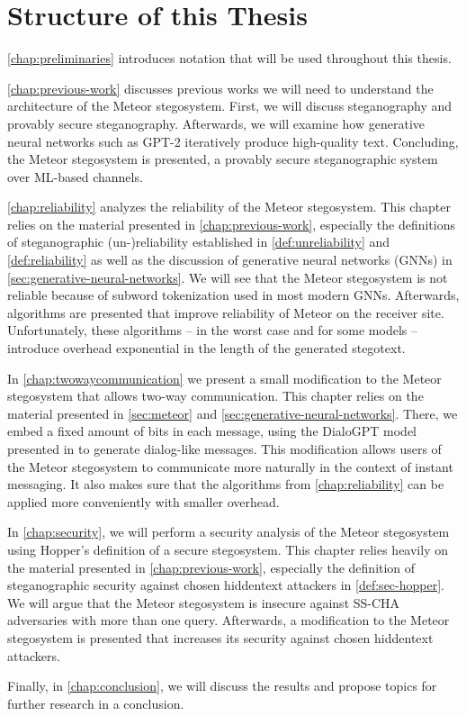\section{Structure of this Thesis}

\autoref{chap:preliminaries} introduces notation that will be used throughout this thesis.

\autoref{chap:previous-work} discusses previous works we will need to understand the architecture of the Meteor stegosystem.
First, we will discuss steganography and provably secure steganography.
Afterwards, we will examine how generative neural networks such as GPT-2 iteratively produce high-quality text.
Concluding, the Meteor stegosystem is presented, a provably secure steganographic system over ML-based channels.

\autoref{chap:reliability} analyzes the reliability of the Meteor stegosystem. 
This chapter relies on the material presented in \autoref{chap:previous-work}, especially the definitions of steganographic (un-)reliability established in \autoref{def:unreliability} and \autoref{def:reliability} as well as the discussion of generative neural networks (GNNs) in \autoref{sec:generative-neural-networks}.
We will see that the Meteor stegosystem is not reliable because of subword tokenization used in most modern GNNs.
Afterwards, algorithms are presented that improve reliability of Meteor on the receiver site.
Unfortunately, these algorithms -- in the worst case and for some models -- introduce overhead exponential in the length of the generated stegotext.

In \autoref{chap:twowaycommunication} we present a small modification to the Meteor stegosystem that allows two-way communication.
This chapter relies on the material presented in \autoref{sec:meteor} and \autoref{sec:generative-neural-networks}.
There, we embed a fixed amount of bits in each message, using the DialoGPT model presented in \cite{Zhang2020} to generate dialog-like messages.
This modification allows users of the Meteor stegosystem to communicate more naturally in the context of instant messaging.
It also makes sure that the algorithms from \autoref{chap:reliability} can be applied more conveniently with smaller overhead.

In \autoref{chap:security}, we will perform a security analysis of the Meteor stegosystem using Hopper's definition of a secure stegosystem.
This chapter relies heavily on the material presented in \autoref{chap:previous-work}, especially the definition of steganographic security against chosen hiddentext attackers in \autoref{def:sec-hopper}.
We will argue that the Meteor stegosystem is insecure against SS-CHA adversaries with more than one query.
Afterwards, a modification to the Meteor stegosystem is presented that increases its security against chosen hiddentext attackers.

Finally, in \autoref{chap:conclusion}, we will discuss the results and propose topics for further research in a conclusion.